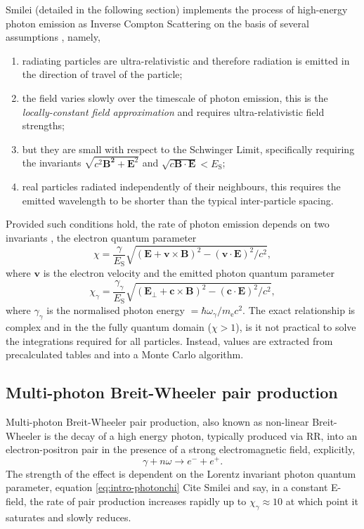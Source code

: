 Smilei (detailed in the following section) implements the process of high-energy photon emission as Inverse Compton Scattering on the basis of several assumptions \cite{nielQuantumClassicalModeling2018}, namely,
\begin{enumerate}
	\item radiating particles are ultra-relativistic and therefore radiation is emitted in the direction of travel of the particle;
	\item the field varies slowly over the timescale of photon emission, this is the \textit{locally-constant field approximation} and requires ultra-relativistic field strengths;
	\item but they are small with respect to the Schwinger Limit, specifically requiring the invariants $\sqrt{c^2\mathbf{B^2} + \mathbf{E}^2}$ and $\sqrt{c\mathbf{B}\cdot\mathbf{E}} < E_\mathrm{S}$;
	\item real particles radiated independently of their neighbours, this requires the emitted wavelength to be shorter than the typical inter-particle spacing.
\end{enumerate}
Provided such conditions hold, the rate of photon emission depends on two invariants \cite{ritusQuantumEffectsInteraction1985}, the electron quantum parameter
\begin{equation}
	\chi = \frac{\gamma}{E_\mathrm{S}}\sqrt{(\mathbf{E} + \mathbf{v}\times\mathbf{B})^2- (\mathbf{v}\cdot\mathbf{E})^2/c^2},
\end{equation}
where $\mathbf{v}$ is the electron velocity and the emitted photon quantum parameter
\begin{equation}\label{eq:intro-photonchi}
	\chi_\gamma = \frac{\gamma_\gamma}{E_\mathrm{S}}\sqrt{(\mathbf{E}_\perp + \mathbf{c}\times\mathbf{B})^2- (\mathbf{c}\cdot\mathbf{E})^2/c^2},
\end{equation}
where $\gamma_\gamma$ is the normalised photon energy $=\hbar \omega_\gamma /m_\mathrm{e}c^2$. The exact relationship is complex and in the the fully quantum domain ($\chi > 1$), is it not practical to solve the integrations required for all particles. Instead, values are extracted from precalculated tables and into a Monte Carlo algorithm. 

\subsection{Multi-photon Breit-Wheeler pair production}
Multi-photon Breit-Wheeler pair production, also known as non-linear Breit-Wheeler is the decay of a high energy photon, typically produced via \ac{RR}, into an electron-positron pair in the presence of a strong electromagnetic field, explicitly,
\begin{equation}
	\gamma + n\omega \to e^- + e^+.
\end{equation}
The strength of the effect is dependent on the Lorentz invariant photon quantum parameter, equation \ref{eq:intro-photonchi} Cite Smilei and say, in a constant E-field, the rate of pair production increases rapidly up to $\chi_\gamma \approx 10$ at which point it saturates and slowly reduces.

